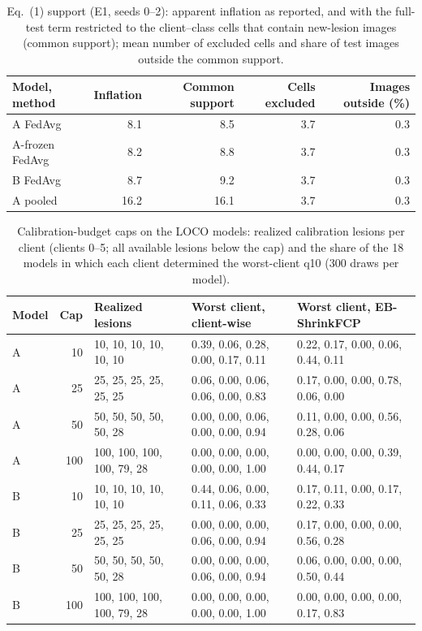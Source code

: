 \documentclass[10pt]{article}
\begin{document}
\begin{table}[!htbp]
\centering
\scriptsize
\caption{Eq.~(1) support (E1, seeds 0--2): apparent inflation as reported, and with the full-test term restricted to the client--class cells that contain new-lesion images (common support); mean number of excluded cells and share of test images outside the common support.}
\label{tab:s18c}
\begin{tabular}{@{}lrrrr@{}}
\toprule
Model, method & Inflation & Common support & Cells excluded & Images outside (\%) \\
\midrule
A FedAvg & 8.1 & 8.5 & 3.7 & 0.3 \\
A-frozen FedAvg & 8.2 & 8.8 & 3.7 & 0.3 \\
B FedAvg & 8.7 & 9.2 & 3.7 & 0.3 \\
A pooled & 16.2 & 16.1 & 3.7 & 0.3 \\
\bottomrule
\end{tabular}
\end{table}
\begin{table}[!htbp]
\centering
\scriptsize
\caption{Calibration-budget caps on the LOCO models: realized calibration lesions per client (clients 0--5; all available lesions below the cap) and the share of the 18 models in which each client determined the worst-client q10 (300 draws per model).}
\label{tab:s18d}
\begin{tabular}{@{}lrp{3.6cm}p{3.6cm}p{3.6cm}@{}}
\toprule
Model & Cap & Realized lesions & Worst client, client-wise & Worst client, EB-ShrinkFCP \\
\midrule
A & 10 & 10, 10, 10, 10, 10, 10 & 0.39, 0.06, 0.28, 0.00, 0.17, 0.11 & 0.22, 0.17, 0.00, 0.06, 0.44, 0.11 \\
A & 25 & 25, 25, 25, 25, 25, 25 & 0.06, 0.00, 0.06, 0.06, 0.00, 0.83 & 0.17, 0.00, 0.00, 0.78, 0.06, 0.00 \\
A & 50 & 50, 50, 50, 50, 50, 28 & 0.00, 0.00, 0.06, 0.00, 0.00, 0.94 & 0.11, 0.00, 0.00, 0.56, 0.28, 0.06 \\
A & 100 & 100, 100, 100, 100, 79, 28 & 0.00, 0.00, 0.00, 0.00, 0.00, 1.00 & 0.00, 0.00, 0.00, 0.39, 0.44, 0.17 \\
\midrule
B & 10 & 10, 10, 10, 10, 10, 10 & 0.44, 0.06, 0.00, 0.11, 0.06, 0.33 & 0.17, 0.11, 0.00, 0.17, 0.22, 0.33 \\
B & 25 & 25, 25, 25, 25, 25, 25 & 0.00, 0.00, 0.00, 0.06, 0.00, 0.94 & 0.17, 0.00, 0.00, 0.00, 0.56, 0.28 \\
B & 50 & 50, 50, 50, 50, 50, 28 & 0.00, 0.00, 0.00, 0.06, 0.00, 0.94 & 0.06, 0.00, 0.00, 0.00, 0.50, 0.44 \\
B & 100 & 100, 100, 100, 100, 79, 28 & 0.00, 0.00, 0.00, 0.00, 0.00, 1.00 & 0.00, 0.00, 0.00, 0.00, 0.17, 0.83 \\
\bottomrule
\end{tabular}
\end{table}
\end{document}

